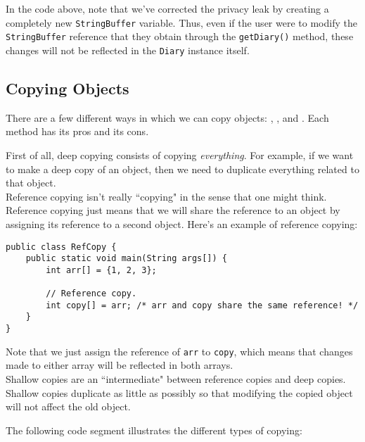 In the code above, note that we've corrected the privacy leak by creating a completely new \verb!StringBuffer! variable. Thus, even if the user were to modify the \verb!StringBuffer! reference that they obtain through the \verb!getDiary()! method, these changes will not be reflected in the \verb!Diary! instance itself. 

\subsection{Copying Objects}

There are a few different ways in which we can copy objects: , , and . Each method has its pros and its cons. 


First of all, deep copying consists of copying \textit{everything}. For example, if we want to make a deep copy of an object, then we need to duplicate everything related to that object. \\

Reference copying isn't really ``copying" in the sense that one might think. Reference copying just means that we will share the reference to an object by assigning its reference to a second object. Here's an example of reference copying:

\begin{lstlisting}
public class RefCopy {
    public static void main(String args[]) {
        int arr[] = {1, 2, 3};
        
        // Reference copy.
        int copy[] = arr; /* arr and copy share the same reference! */
    }
}
\end{lstlisting}

Note that we just assign the reference of \verb!arr! to \verb!copy!, which means that changes made to either array will be reflected in both arrays. \\

Shallow copies are an ``intermediate" between reference copies and deep copies. Shallow copies duplicate as little as possibly so that modifying the copied object will not affect the old object.

The following code segment illustrates the different types of copying:

